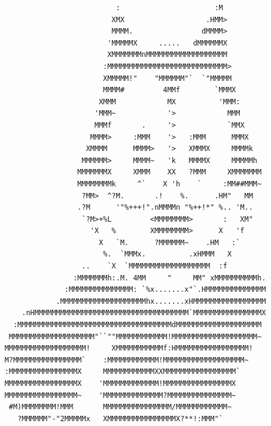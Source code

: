 \documentclass[a4paper,11pt]{article}
\begin{document}
	\begin{verbatim}
	                          :                      :M
	                         XMX                   .HMM>
	                         MMMM.                dMMMM>
	                        'MMMMMX     .....   dMMMMMMX
	                        XMMMMMMMnMMMMMMMMMMMMMMMMMMM
	                       :MMMMMMMMMMMMMMMMMMMMMMMMMMMM>
	                       XMMMMM!"    "MMMMMM"`  `"MMMMM
	                       MMMM#         4MMf        `MMMX
	                      XMMM            MX          'MMM:
	                     'MMM~            '>            MMM
	                     MMMf       .     '>            `MMX
	                    MMMM>     :MMM    '>   :MMM      MMMX
	                   XMMMM      MMMM>   '>   XMMMX     MMMMk
	                  MMMMMM>     MMMM~   'k   MMMMX     MMMMMh
	                 MMMMMMMX     XMMM    XX   ?MMM     XMMMMMMM
	                 MMMMMMMMk     ^`    X 'h    `     :MM##MMM~
	                  ?MM>  ^?M.       .!    %.      .HM"   MM
	                 .?M      '"%+++!".nMMMMn "%++!*" %.. 'M..
	                  `?M>+%L         <MMMMMMMM>       :   XM"
	                    'X   %        XMMMMMMMM>      X   'f
	                      X   `M.      ?MMMMMM~    .HM   :`
	                       %.  `MMMx.          .xHMMM   X
	                  ..    `X  `MMMMMMMMMMMMMMMMMMM  :f
	                :MMMMMMMh:.M. 4MM     "     MM" xMMMMMMMMMMh.
	              :MMMMMMMMMMMMMMM: `%x.......x"`.HMMMMMMMMMMMMMM
	            .MMMMMMMMMMMMMMMMMMMMhx.......xHMMMMMMMMMMMMMMMMM
	    .nHMMMMMMMMMMMMMMMMMMMMMMMMMMMMMMMMMMMM`MMMMMMMMMMMMMMMMX
	  :MMMMMMMMMMMMMMMMMMMMMMMMMMMMMMMMMMMMdMMMMMMMMMMMMMMMMMMMM
	 MMMMMMMMMMMMMMMMMMMM"``""MMMMMMMMMMMM!MMMMMMMMMMMMMMMMMMMM~
	MMMMMMMMMMMMMMMMMMM!     XMMMMMMMMMMMf:HMMMMMMMMMMMMMMMMM!
	M?MMMMMMMMMMMMMMMM`    :MMMMMMMMMMMM!MMMMMMMMMMMMMMMMMMM~
	:MMMMMMMMMMMMMMMMX     MMMMMMMMMMMMXXMMMMMMMMMMMMMMMMM`
	MMMMMMMMMMMMMMMMMX    'MMMMMMMMMMMMM!MMMMMMMMMMMMMMMMX
	MMMMMMMMMMMMMMMMM~    'MMMMMMMMMMMMMM?MMMMMMMMMMMMMMM~
	 #M)MMMMMMMM!MMM       MMMMMMMMMMMMMMMM/MMMMMMMMMMMM~
	   ?MMMMMM"-"2MMMMMx   XMMMMMMMMMMMMMMMMX?**!:MMM"`
	\end{verbatim}
\end{document}
